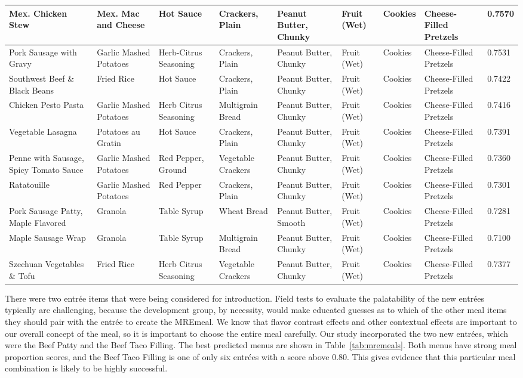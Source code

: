 \begin{landscape}
\begin{longtable}{p{3.0cm}p{3.7cm}p{2.2cm}p{2.0cm}p{2.3cm}p{0.8cm}p{1.5cm}p{2.2cm}p{0.8cm}}
\midrule
Mex. Chicken Stew & Mex. Mac and Cheese & Hot Sauce & Crackers, Plain & Peanut Butter, Chunky & Fruit (Wet) & Cookies & Cheese-Filled Pretzels & 0.7570 \\
\midrule
Pork Sausage with Gravy & Garlic Mashed Potatoes & Herb-Citrus Seasoning & Crackers, Plain & Peanut Butter, Chunky & Fruit (Wet) & Cookies & Cheese-Filled Pretzels & 0.7531 \\
\midrule
Southwest Beef \& Black Beans & Fried Rice & Hot Sauce & Crackers, Plain & Peanut Butter, Chunky & Fruit (Wet) & Cookies & Cheese-Filled Pretzels & 0.7422 \\
\midrule
Chicken Pesto Pasta & Garlic Mashed Potatoes & Herb Citrus Seasoning & Multigrain Bread & Peanut Butter, Chunky & Fruit (Wet) & Cookies & Cheese-Filled Pretzels & 0.7416 \\
\midrule
Vegetable Lasagna & Potatoes au Gratin & Hot Sauce & Crackers, Plain & Peanut Butter, Chunky & Fruit (Wet) & Cookies & Cheese-Filled Pretzels & 0.7391 \\
\midrule
Penne with Sausage, Spicy Tomato Sauce & Garlic Mashed Potatoes & Red Pepper, Ground & Vegetable Crackers & Peanut Butter, Chunky & Fruit (Wet) & Cookies & Cheese-Filled Pretzels & 0.7360 \\
\midrule
Ratatouille & Garlic Mashed Potatoes & Red Pepper & Crackers, Plain & Peanut Butter, Chunky & Fruit (Wet) & Cookies & Cheese-Filled Pretzels & 0.7301 \\
\midrule
Pork Sausage Patty, Maple Flavored & Granola & Table Syrup & Wheat Bread & Peanut Butter, Smooth & Fruit (Wet) & Cookies & Cheese-Filled Pretzels & 0.7281 \\
\midrule
Maple Sausage Wrap & Granola & Table Syrup & Multigrain Bread & Peanut Butter, Chunky & Fruit (Wet) & Cookies & Cheese-Filled Pretzels & 0.7100 \\
\midrule
Szechuan Vegetables \& Tofu & Fried Rice & Herb Citrus Seasoning & Vegetable Crackers & Peanut Butter, Chunky & Fruit (Wet) & Cookies & Cheese-Filled Pretzels & 0.7377 \\
\end{longtable}
\end{landscape}

There were two entrée items that were being considered for introduction.  Field tests to evaluate the palatability of the new entrées typically are challenging, because the development group, by necessity, would make educated guesses as to which of the other meal items they should pair with the entrée to create the MRE\tm meal.  We know that flavor contrast effects and other contextual effects are important to our overall concept of the meal, so it is important to choose the entire meal carefully.  Our study incorporated the two new entrées, which were the Beef Patty and the Beef Taco Filling.  The best predicted menus are shown in Table~\ref{tab:mremeals}.  Both menus have strong meal proportion scores, and the Beef Taco Filling is one of only six entrées with a score above 0.80.  This gives evidence that this particular meal combination is likely to be highly successful.  

